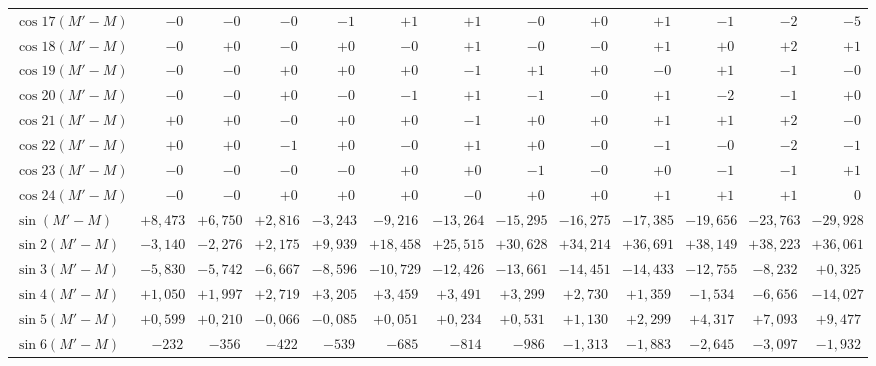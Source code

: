 \begin{landscape}
\begin{longtable}{@{}l|r|r|r|r|r|r|r|r|r|r|r|r@{}}
\(\cos 17(M'-M)\) & \(-0\) & \(-0\) & \(-0\) & \(-1\) & \(+1\) & \(+1\) & \(-0\) & \(+0\) & \(+1\) & \(-1\) & \(-2\) & \(-5\)\\
\(\cos 18(M'-M)\) & \(-0\) & \(+0\) & \(-0\) & \(+0\) & \(-0\) & \(+1\) & \(-0\) & \(-0\) & \(+1\) & \(+0\) & \(+2\) & \(+1\)\\
\(\cos 19(M'-M)\) & \(-0\) & \(-0\) & \(+0\) & \(+0\) & \(+0\) & \(-1\) & \(+1\) & \(+0\) & \(-0\) & \(+1\) & \(-1\) & \(-0\)\\
\(\cos 20(M'-M)\) & \(-0\) & \(-0\) & \(+0\) & \(-0\) & \(-1\) & \(+1\) & \(-1\) & \(-0\) & \(+1\) & \(-2\) & \(-1\) & \(+0\)\\
\(\cos 21(M'-M)\) & \(+0\) & \(+0\) & \(-0\) & \(+0\) & \(+0\) & \(-1\) & \(+0\) & \(+0\) & \(+1\) & \(+1\) & \(+2\) & \(-0\)\\
\(\cos 22(M'-M)\) & \(+0\) & \(+0\) & \(-1\) & \(+0\) & \(-0\) & \(+1\) & \(+0\) & \(-0\) & \(-1\) & \(-0\) & \(-2\) & \(-1\)\\
\(\cos 23(M'-M)\) & \(-0\) & \(-0\) & \(-0\) & \(-0\) & \(+0\) & \(+0\) & \(-1\) & \(-0\) & \(+0\) & \(-1\) & \(-1\) & \(+1\)\\
\(\cos 24(M'-M)\) & \(-0\) & \(-0\) & \(+0\) & \(+0\) & \(+0\) & \(-0\) & \(+0\) & \(+0\) & \(+1\) & \(+1\) & \(+1\) & \(0\)\\[6pt]
\(\sin(M'-M)\) & \(+8{,}473\) & \(+6{,}750\) & \(+2{,}816\) & \(-3{,}243\) & \(-9{,}216\) & \(-13{,}264\) & \(-15{,}295\) & \(-16{,}275\) & \(-17{,}385\) & \(-19{,}656\) & \(-23{,}763\) & \(-29{,}928\)\\
\(\sin 2(M'-M)\) & \(-3{,}140\) & \(-2{,}276\) & \(+2{,}175\) & \(+9{,}939\) & \(+18{,}458\) & \(+25{,}515\) & \(+30{,}628\) & \(+34{,}214\) & \(+36{,}691\) & \(+38{,}149\) & \(+38{,}223\) & \(+36{,}061\)\\
\(\sin 3(M'-M)\) & \(-5{,}830\) & \(-5{,}742\) & \(-6{,}667\) & \(-8{,}596\) & \(-10{,}729\) & \(-12{,}426\) & \(-13{,}661\) & \(-14{,}451\) & \(-14{,}433\) & \(-12{,}755\) & \(-8{,}232\) & \(+0{,}325\)\\
\(\sin 4(M'-M)\) & \(+1{,}050\) & \(+1{,}997\) & \(+2{,}719\) & \(+3{,}205\) & \(+3{,}459\) & \(+3{,}491\) & \(+3{,}299\) & \(+2{,}730\) & \(+1{,}359\) & \(-1{,}534\) & \(-6{,}656\) & \(-14{,}027\)\\
\(\sin 5(M'-M)\) & \(+0{,}599\) & \(+0{,}210\) & \(-0{,}066\) & \(-0{,}085\) & \(+0{,}051\) & \(+0{,}234\) & \(+0{,}531\) & \(+1{,}130\) & \(+2{,}299\) & \(+4{,}317\) & \(+7{,}093\) & \(+9{,}477\)\\
\(\sin 6(M'-M)\) & \(-232\) & \(-356\) & \(-422\) & \(-539\) & \(-685\) & \(-814\) & \(-986\) & \(-1{,}313\) & \(-1{,}883\) & \(-2{,}645\) & \(-3{,}097\) & \(-1{,}932\)\\

\end{longtable}
\end{landscape}
